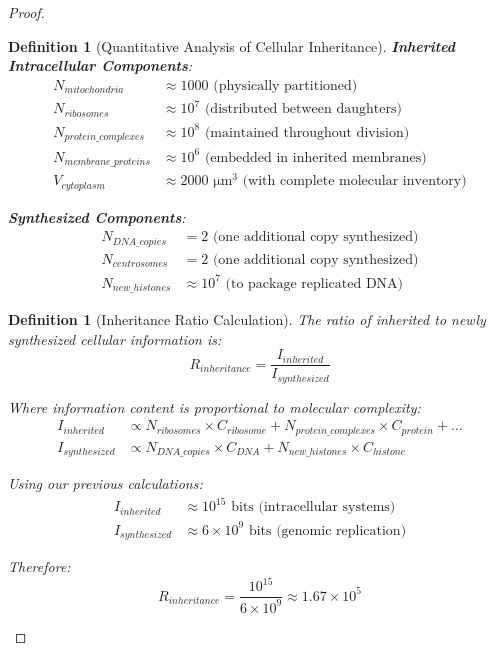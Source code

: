 \documentclass[12pt,a4paper]{article}
\newtheorem{definition}[theorem]{Definition}
\begin{document}
\begin{proof}
\begin{definition}[Quantitative Analysis of Cellular Inheritance]
\textbf{Inherited Intracellular Components}:
\begin{align}
N_{mitochondria} &\approx 1000 \text{ (physically partitioned)} \\
N_{ribosomes} &\approx 10^7 \text{ (distributed between daughters)} \\
N_{protein\_complexes} &\approx 10^8 \text{ (maintained throughout division)} \\
N_{membrane\_proteins} &\approx 10^6 \text{ (embedded in inherited membranes)} \\
V_{cytoplasm} &\approx 2000 \text{ μm}^3 \text{ (with complete molecular inventory)}
\end{align}

\textbf{Synthesized Components}:
\begin{align}
N_{DNA\_copies} &= 2 \text{ (one additional copy synthesized)} \\
N_{centrosomes} &= 2 \text{ (one additional copy synthesized)} \\
N_{new\_histones} &\approx 10^7 \text{ (to package replicated DNA)}
\end{align}
\end{definition}

\begin{definition}[Inheritance Ratio Calculation]
The ratio of inherited to newly synthesized cellular information is:
\begin{equation}
R_{inheritance} = \frac{I_{inherited}}{I_{synthesized}}
\end{equation}

Where information content is proportional to molecular complexity:
\begin{align}
I_{inherited} &\propto N_{ribosomes} \times C_{ribosome} + N_{protein\_complexes} \times C_{protein} + ... \\
I_{synthesized} &\propto N_{DNA\_copies} \times C_{DNA} + N_{new\_histones} \times C_{histone}
\end{align}

Using our previous calculations:
\begin{align}
I_{inherited} &\approx 10^{15} \text{ bits (intracellular systems)} \\
I_{synthesized} &\approx 6 \times 10^9 \text{ bits (genomic replication)}
\end{align}

Therefore:
\begin{equation}
R_{inheritance} = \frac{10^{15}}{6 \times 10^9} \approx 1.67 \times 10^5
\end{equation}


\end{definition}
\end{proof}
\end{document}
